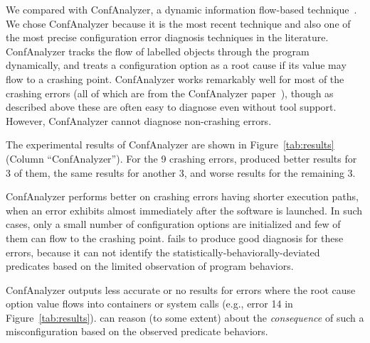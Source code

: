 We compared \ourtool with ConfAnalyzer, a dynamic information
flow-based technique~\cite{Rabkin:2011:PPC}.
We chose ConfAnalyzer because it is the most recent technique and
also one of the most precise configuration error diagnosis techniques
in the literature.
ConfAnalyzer tracks the flow of labelled objects through the
program dynamically,
and treats a configuration option as a root cause if its
value may flow to a crashing point.
ConfAnalyzer works remarkably well for most of the crashing errors (all of
which are from the ConfAnalyzer paper~\cite{Rabkin:2011:PPC}), though as
described above these are often easy to diagnose even without tool
support. However, ConfAnalyzer cannot diagnose non-crashing errors.

The experimental results of ConfAnalyzer are shown in
Figure~\ref{tab:results} (Column ``ConfAnalyzer'').
For the 9 crashing errors, \ourtool produced better results for 3 of them,
the same results for another 3, and worse results for the remaining 3.

ConfAnalyzer performs better on crashing errors
having shorter execution paths, when an error exhibits
almost immediately after the software is launched.
In such cases, only a small number of configuration options are initialized and
few of them can flow to the crashing point. 
\ourtool fails to produce good diagnosis for these errors, because it can not identify
 the statistically-behaviorally-deviated predicates based on the limited
observation of program behaviors.

ConfAnalyzer outputs less accurate or no results
for errors where the root cause option value
flows into containers or system calls (e.g., error 14 in Figure~\ref{tab:results}).
\ourtool can reason (to some extent) about the \textit{consequence} of
such a misconfiguration based on the observed predicate behaviors.
